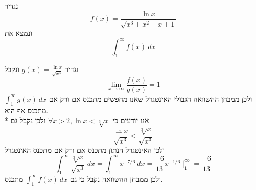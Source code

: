 



נגדיר
\[
	f(x) = \frac{\ln x}{\sqrt{x^3 + x^2 - x + 1}}
\]
ונמצא את
\[
	\int_{1}^{\infty} f(x)\ dx
\]

נגדיר $g(x) = \frac{\ln x}{\sqrt{x^3}}$ ונקבל
\[
	\lim_{x \to \infty} \frac{f(x)}{g(x)} = 1
\]
ולכן ממבחן ההשוואה הגבולי האינטגרל שאנו מחפשים מתכנס אם ורק אם $\int_{1}^{\infty} g(x)\ dx$ מתכנס אף הוא. \\*
אנו יודעים כי $\forall x > 2, \ln x < \sqrt[3]{x}$ ולכן נקבל גם
\[
	\frac{\ln x}{\sqrt{x^3}} < \frac{\sqrt[3]{x}}{\sqrt{x^3}}
\]
ולכן האינטגרל הנתון מתכנס אם ורק אם מתכנס האינטגרל
\[
	\int_{1}^{\infty} \frac{\sqrt[3]{x}}{\sqrt{x^3}}\ dx
	= \int_{1}^{\infty} x^{-7/6}\ dx
	= \frac{-6}{13} x^{-1/6} \mid_1^\infty = \frac{-6}{13}
\]
ולכן ממבחן ההשוואה נקבל כי גם $\int_{1}^{\infty} f(x)\ dx$ מתכנס.


